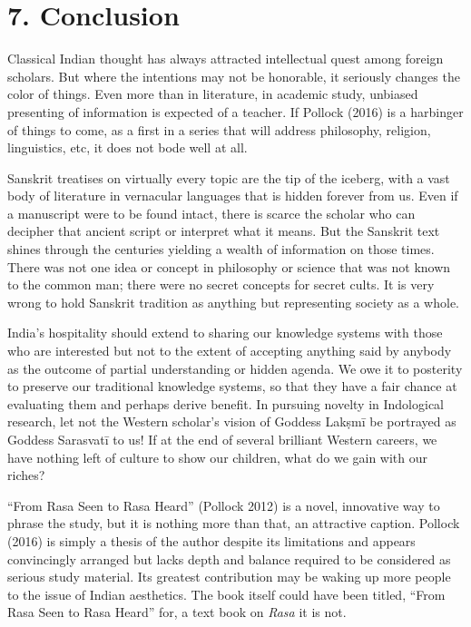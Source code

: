 \section*{7. Conclusion}

Classical Indian thought has always attracted intellectual quest among foreign scholars. But where the intentions may not be honorable, it seriously changes the color of things. Even more than in literature, in academic study, unbiased presenting of information is expected of a teacher. If Pollock (2016) is a harbinger of things to come, as a first in a series that will address philosophy, religion, linguistics, etc, it does not bode well at all.

Sanskrit treatises on virtually every topic are the tip of the iceberg, with a vast body of literature in vernacular languages that is hidden forever from us. Even if a manuscript were to be found intact, there is scarce the scholar who can decipher that ancient script or interpret what it means. But the Sanskrit text shines through the centuries yielding a wealth of information on those times. There was not one idea or concept in philosophy or science that was not known to the common man; there were no secret concepts for secret cults. It is very wrong to hold Sanskrit tradition as anything but representing society as a whole.

India’s hospitality should extend to sharing our knowledge systems with those who are interested but not to the extent of accepting anything said by anybody as the outcome of partial understanding or hidden agenda. We owe it to posterity to preserve our traditional knowledge systems, so that they have a fair chance at evaluating them and perhaps derive benefit. In pursuing novelty in Indological research, let not the Western scholar’s vision of Goddess Lakṣmī be portrayed as Goddess Sarasvatī to us! If at the end of several brilliant Western careers, we have nothing left of culture to show our children, what do we gain with our riches?

“From Rasa Seen to Rasa Heard” (Pollock 2012) is a novel, innovative way to phrase the study, but it is nothing more than that, an attractive caption. Pollock (2016) is simply a thesis of the author despite its limitations and appears convincingly arranged but lacks depth and balance required to be considered as serious study material. Its greatest contribution may be waking up more people to the issue of Indian aesthetics. The book itself could have been titled, “From Rasa Seen to Rasa Heard” for, a text book on \textit{Rasa} it is not.


